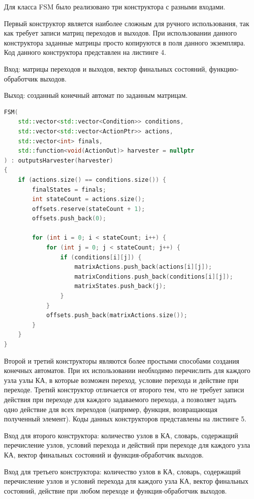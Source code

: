 \documentclass[a4paper,final]{article}
\begin{document}
Для класса FSM было реализовано три конструктора с разными входами.

Первый конструктор является наиболее сложным для ручного использования, так как требует записи матриц переходов и выходов. При использовании данного конструктора заданные матрицы просто копируются в поля данного экземпляра. Код данного конструктора представлен на листинге 4.

Вход: матрицы переходов и выходов, вектор финальных состояний, функцию-обработчик выходов.

Выход: созданный конечный автомат по заданным матрицам.

\footnotesize{
\begin{lstlisting}[language=C++, caption = {Код первого конструктора класса FSM}]
FSM(
    std::vector<std::vector<Condition>> conditions,
    std::vector<std::vector<ActionPtr>> actions,
    std::vector<int> finals,
    std::function<void(ActionOut)> harvester = nullptr
) : outputsHarvester(harvester)
{
    if (actions.size() == conditions.size()) {
        finalStates = finals;
        int stateCount = actions.size();
        offsets.reserve(stateCount + 1);
        offsets.push_back(0);

        for (int i = 0; i < stateCount; i++) {
            for (int j = 0; j < stateCount; j++) {
                if (conditions[i][j]) {
                    matrixActions.push_back(actions[i][j]);
                    matrixConditions.push_back(conditions[i][j]);
                    matrixStates.push_back(j);
                }
            }
            offsets.push_back(matrixActions.size());
        }
    }
}
\end{lstlisting}
}
\small

Второй и третий конструкторы являются более простыми способами создания конечных автоматов. При их использовании необходимо перечислить для каждого узла узлы КА, в которые возможен переход, условие перехода и действие при переходе. Третий конструктор отличается от второго тем, что не требует записи действия при переходе для каждого задаваемого перехода, а позволяет задать одно действие для всех переходов (например, функция, возвращающая полученный элемент). Коды данных конструкторов представлены на листинге 5.

Вход для второго конструктора: количество узлов в КА, словарь, содержащий перечисление узлов, условий перехода и действий при переходе для каждого узла КА, вектор финальных состояний и функция-обработчик выходов.

Вход для третьего конструктора: количество узлов в КА, словарь, содержащий перечисление узлов и условий перехода для каждого узла КА, вектор финальных состояний, действие при любом переходе и функция-обработчик выходов.
\end{document}
